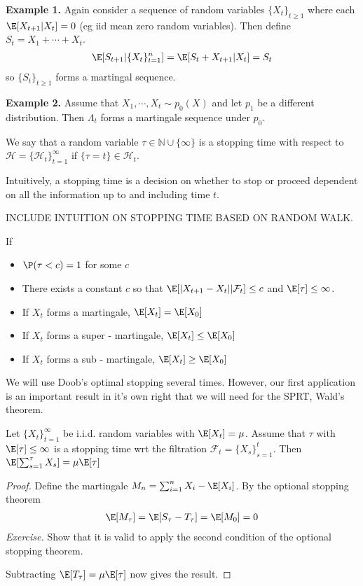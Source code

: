 \noindent\textbf{Example 1.} Again consider a sequence of random variables $\{X_t\}_{t\geq 1}$ where each $\E[X_{t+1}|X_t] = 0$ (eg iid mean zero random variables). Then define $S_t = X_1+\cdots + X_t$.
\begin{align*}
    \E[S_{t+1}|\{X_t\}_{t=1}^n] = \E[S_{t} + X_{t+1}|X_t] = S_t 
\end{align*}
so $\{S_t\}_{t\geq 1}$ forms a martingal sequence.

\noindent\textbf{Example 2.} Assume that $X_1, \cdots, X_t\sim p_0(X)$ and let $p_1$ be a different distribution. Then $\Lambda_t$ forms a martingale sequence under $p_0$.


\begin{definition}
    We say that a random variable $\tau\in \mathbb{N}\cup \{\infty\}$ is a stopping time with respect to $\mathcal{H} = \{\mathcal{H}_t\}_{t=1}^{\infty}$ if $\{\tau = t\}\in \mathcal{H}_t$.
\end{definition}
Intuitively, a stopping time is a decision on whether to stop or proceed dependent on all the information up to and including time $t$.

INCLUDE INTUITION ON STOPPING TIME BASED ON RANDOM WALK.

\begin{theorem}
If 
\begin{itemize}
\item $\P(\tau < c) = 1$ for some $c$
\item There exists a constant $c$ so that $\E[|X_{t+1} - X_t||\mathcal{F}_t] \leq c$ and $\E[\tau] \leq \infty$.
\end{itemize}
\begin{itemize}
    \item If $X_t$ forms a martingale, $\E[X_t] = \E[X_0]$
    \item If $X_t$ forms a super - martingale, $\E[X_t] \leq \E[X_0]$
    \item If $X_t$ forms a sub - martingale, $\E[X_t] \geq \E[X_0]$
\end{itemize}
\end{theorem}

We will use Doob's optimal stopping several times. However, our first application is an important result in it's own right that we will need for the SPRT, Wald's theorem.

\begin{theorem}
    Let $\{X_t\}_{t=1}^{\infty}$ be i.i.d. random variables with $\E[X_t] = \mu$. Assume that $\tau$ with $\E[\tau]\leq \infty$ is a stopping time wrt the filtration $\mathcal{F}_{t} = \{X_s\}_{s=1}^t$. Then $\E[\sum_{s=1}^{\tau} X_s] = \mu\E[\tau]$
\end{theorem}
\begin{proof}
    Define the martingale $M_n = \sum_{i=1}^n X_i - \E[X_i]$. By the optional stopping theorem
    \begin{align*}
        \E[M_{\tau}] = \E[S_{\tau} - T_{\tau}] = \E[M_0] = 0
    \end{align*}
    \textit{Exercise.} Show that it is valid to apply the second condition of the optional stopping theorem. 
    
    Subtracting $\E[T_{\tau}] = \mu\E[\tau]$ now gives the result. 
\end{proof}